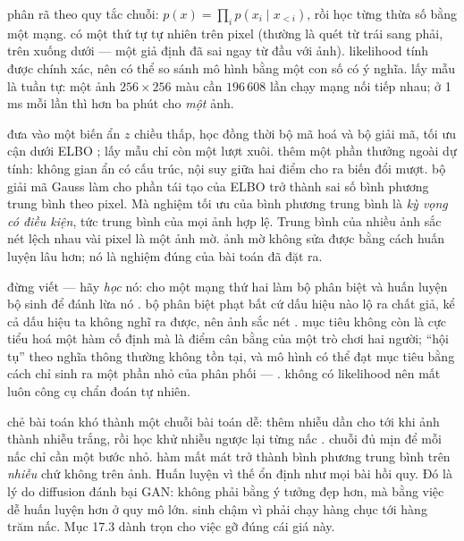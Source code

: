 \documentclass[../../../deep_learning.tex]{subfiles}
\begin{document}
\begin{mach}
\item {} \gp phân rã theo quy tắc chuỗi: \(p(x) = \prod_i p(x_i \mid x_{<i})\), rồi học từng thừa số bằng một mạng. \gd có một thứ tự tự nhiên trên pixel (thường là quét từ trái sang phải, trên xuống dưới --- một giả định đã sai ngay từ đầu với ảnh). \hq likelihood tính được chính xác, nên có thể so sánh mô hình bằng một con số có ý nghĩa. \gia lấy mẫu là tuần tự: một ảnh \(256\times256\) màu cần \(196\,608\) lần chạy mạng nối tiếp nhau; ở 1 ms mỗi lần thì hơn ba phút cho \emph{một} ảnh.
\item {} \gp đưa vào một biến ẩn \(z\) chiều thấp, học đồng thời bộ mã hoá và bộ giải mã, tối ưu cận dưới ELBO \cite{kingma2014vae}; lấy mẫu chỉ còn một lượt xuôi. \hq thêm một phần thưởng ngoài dự tính: không gian ẩn có cấu trúc, nội suy giữa hai điểm cho ra biến đổi mượt. \gia bộ giải mã Gauss làm cho phần tái tạo của ELBO trở thành sai số bình phương trung bình theo pixel. Mà nghiệm tối ưu của bình phương trung bình là \emph{kỳ vọng có điều kiện}, tức trung bình của mọi ảnh hợp lệ. Trung bình của nhiều ảnh sắc nét lệch nhau vài pixel là một ảnh mờ.
 \vdm ảnh mờ không sửa được bằng cách huấn luyện lâu hơn; nó là nghiệm đúng của bài toán đã đặt ra.
\item {} \gp đừng viết --- hãy \emph{học} nó: cho một mạng thứ hai làm bộ phân biệt và huấn luyện bộ sinh để đánh lừa nó \cite{goodfellow2014gan}. \hq bộ phân biệt phạt bất cứ dấu hiệu nào lộ ra chất giả, kể cả dấu hiệu ta không nghĩ ra được, nên ảnh sắc nét \cite{karras2019stylegan}.
 \gia mục tiêu không còn là cực tiểu hoá một hàm cố định mà là điểm cân bằng của một trò chơi hai người; ``hội tụ'' theo nghĩa thông thường không tồn tại, và mô hình có thể đạt mục tiêu bằng cách chỉ sinh ra một phần nhỏ của phân phối --- . \vdm không có likelihood nên mất luôn công cụ chẩn đoán tự nhiên.
\item {} \gp chẻ bài toán khó thành một chuỗi bài toán dễ: thêm nhiễu dần cho tới khi ảnh thành nhiễu trắng, rồi học khử nhiễu ngược lại từng nấc \cite{ho2020ddpm,song2021score}. \gd chuỗi đủ mịn để mỗi nấc chỉ cần một bước nhỏ. \hq hàm mất mát trở thành bình phương trung bình trên \emph{nhiễu} chứ không trên ảnh. Huấn luyện vì thế ổn định như mọi bài hồi quy. Đó là lý do diffusion đánh bại GAN: không phải bằng ý tưởng đẹp hơn, mà bằng việc dễ huấn luyện hơn ở quy mô lớn. \gia sinh chậm vì phải chạy hàng chục tới hàng trăm nấc. Mục 17.3 dành trọn cho việc gỡ đúng cái giá này.
\end{mach}
\end{document}
